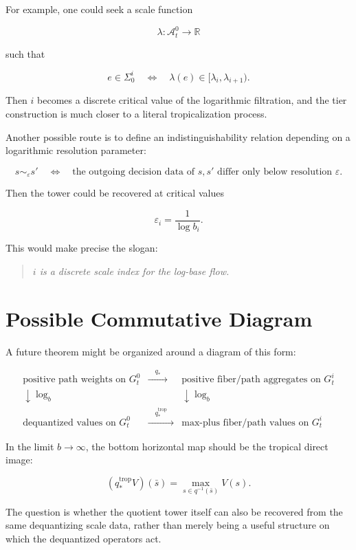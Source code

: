 \documentclass[11pt]{article}
\newcommand{\A}{\mathcal A}
\newcommand{\R}{\mathbb R}
\newenvironment{claimbox}
  {\begin{quote}\itshape}
  {\end{quote}}
\begin{document}
For example, one could seek a scale function

\[
\lambda:\A_t^0\to \R
\]

such that

\[
e\in \Sigma_0^i
\quad\Longleftrightarrow\quad
\lambda(e)\in [\lambda_i,\lambda_{i+1}).
\]

Then \(i\) becomes a discrete critical value of the logarithmic filtration, and
the tier construction is much closer to a literal tropicalization process.

Another possible route is to define an indistinguishability relation depending
on a logarithmic resolution parameter:

\[
s\sim_\varepsilon s'
\quad\Longleftrightarrow\quad
\text{the outgoing decision data of }s,s'
\text{ differ only below resolution }\varepsilon.
\]

Then the tower could be recovered at critical values

\[
\varepsilon_i=\frac{1}{\log b_i}.
\]

This would make precise the slogan:

\begin{claimbox}
\(i\) is a discrete scale index for the log-base flow.
\end{claimbox}

\section{Possible Commutative Diagram}

A future theorem might be organized around a diagram of this form:

\[
\begin{array}{ccc}
\text{positive path weights on }G_t^0
& \xrightarrow{\quad q_*\quad} &
\text{positive fiber/path aggregates on }G_t^i
\\[0.4em]
\downarrow \log_b
&&
\downarrow \log_b
\\[0.4em]
\text{dequantized values on }G_t^0
& \xrightarrow{\quad q_*^{\mathrm{trop}}\quad} &
\text{max-plus fiber/path values on }G_t^i
\end{array}
\]

In the limit \(b\to\infty\), the bottom horizontal map should be the tropical
direct image:

\[
(q_*^{\mathrm{trop}}V)(\bar s)
=
\max_{s\in q^{-1}(\bar s)}V(s).
\]

The question is whether the quotient tower itself can also be recovered from
the same dequantizing scale data, rather than merely being a useful structure
on which the dequantized operators act.
\end{document}

